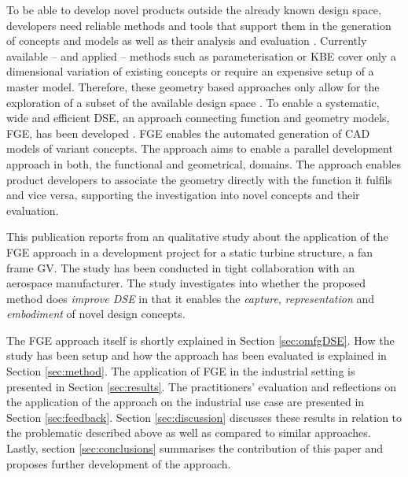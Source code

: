 \documentclass[aerospace,article,submit,moreauthors,pdftex]{Definitions/mdpi}
\begin{document}
To be able to develop novel products outside the already known design space, developers need reliable methods and tools that support them in the generation of concepts and models as well as their analysis and evaluation \cite{Woodbury2006, Kang2011, Isaksson2016}.
Currently available -- and applied -- methods such as parameterisation \citep{VanDerLaan2005ParametricAnalysis} or \ac{KBE} \cite{Sandberg2011} cover only a dimensional variation of existing concepts or require an expensive setup of a master model.
Therefore, these geometry based approaches only allow for the exploration of a subset of the available design space \citep{Woodbury2006, Muller2019ICED}.
To enable a systematic, wide and efficient \ac{DSE}, an approach connecting function and geometry models, \ac{FGE}, has been developed \cite{Muller2021FunctionVariants}.
\Ac{FGE} enables the automated generation of CAD models of variant concepts.
The approach aims to enable a parallel development approach in both, the functional and geometrical, domains.
The approach enables product developers to associate the geometry directly with the function it fulfils and vice versa, supporting the investigation into novel concepts and their evaluation.

This publication reports from an qualitative study about the application of the \ac{FGE} approach in a development project for a static turbine structure, a fan frame \ac{GV}. 
The study has been conducted in tight collaboration with an aerospace manufacturer. 
The study investigates into whether the proposed method does \textit{improve \ac{DSE}} in that it enables the \textit{capture}, \textit{representation} and \textit{embodiment} of novel design concepts.


The \ac{FGE} approach itself is shortly explained in Section \ref{sec:omfgDSE}.
How the study has been setup and how the approach has been evaluated is explained in Section \ref{sec:method}.
The application of \ac{FGE} in the industrial setting is presented in Section \ref{sec:results}. 
The practitioners' evaluation and reflections on the application of the approach on the industrial use case  are presented in Section \ref{sec:feedback}.
Section \ref{sec:discussion} discusses these results in relation to the problematic described above as well as compared to similar approaches.
Lastly, section \ref{sec:conclusions} summarises the contribution of this paper and proposes further development of the approach.
\end{document}
